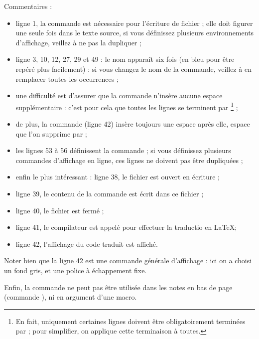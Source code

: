 Commentaires :
\begin{itemize}
  \item ligne 1, la commande  est nécessaire pour l'écriture de fichier ; elle doit figurer une seule fois dans le texte source, si vous définissez plusieurs environnements d'affichage, veillez à ne pas la dupliquer ; 
  \item ligne 3, 10, 12, 27, 29 et 49 : le nom  apparaît six fois (en bleu pour être repéré plus facilement) : si vous changez le nom de la commande, veillez à en remplacer toutes les occurrences ;
  \item une difficulté est d'assurer que la commande n'insère aucune espace supplémentaire : c'est pour cela que toutes les lignes se terminent par \tpp{\%}\footnote{En fait, uniquement certaines lignes doivent être obligatoirement terminées par \tpp{\%} ; pour simplifier, on applique cette terminaison à toutes.} ;
  \item de plus, la commande  (ligne 42) insère toujours une espace après elle, espace que l'on supprime par  ;
    \item les lignes 53 à 56 définissent la commande  ; si vous définissez plusieurs commandes d'affichage en ligne, ces lignes ne doivent pas être dupliquées ;
    \item enfin le plus intéressant : ligne 38, le fichier  est ouvert en écriture ;
    \item ligne 39, le contenu de la commande est écrit dans ce fichier ;
    \item ligne 40, le fichier est fermé ;
    \item ligne 41, le compilateur est appelé pour effectuer la traductio en \LaTeX ;
    \item ligne 42, l'affichage du code traduit est affiché.
\end{itemize}

Noter bien que la ligne 42 est une commande générale d'affichage : ici on a choisi un fond gris, et une police à échappement fixe.

Enfin, la commande  ne peut pas être utilisée dans les notes en bas de page (commande ), ni en argument d'une macro.


